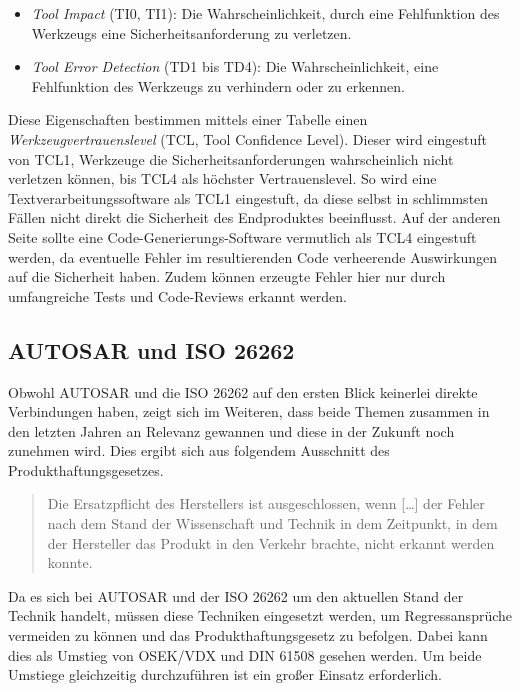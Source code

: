 \documentclass[
  a4paper,					    %
  twoside,
  DIV=calc,     				%
  bibliography=totoc,
  cleardoublepage=empty,
  ngerman,     					%
  final       					%
]{scrbook}
\begin{document}
\begin{itemize}
    \item \emph{Tool Impact} (TI0, TI1): Die Wahrscheinlichkeit, durch eine Fehlfunktion des Werkzeugs eine Sicherheitsanforderung zu verletzen.
    \item \emph{Tool Error Detection} (TD1 bis TD4): Die Wahrscheinlichkeit, eine Fehlfunktion des Werkzeugs zu verhindern oder zu erkennen.
\end{itemize}

Diese Eigenschaften bestimmen mittels einer Tabelle einen \emph{Werkzeugvertrauenslevel} (TCL, Tool Confidence Level). Dieser wird eingestuft von TCL1, Werkzeuge die Sicherheitsanforderungen wahrscheinlich nicht verletzen können, bis TCL4 als höchster Vertrauenslevel. So wird eine Textverarbeitungssoftware als TCL1 eingestuft, da diese selbst in schlimmsten Fällen nicht direkt die Sicherheit des Endproduktes beeinflusst. Auf der anderen Seite sollte eine Code-Generierungs-Software vermutlich als TCL4 eingestuft werden, da eventuelle Fehler im resultierenden Code verheerende Auswirkungen auf die Sicherheit haben. Zudem können erzeugte Fehler hier nur durch umfangreiche Tests und Code-Reviews erkannt werden.




\subsection{AUTOSAR und ISO 26262}
\label{sec:ISO26262_autosar}
Obwohl AUTOSAR und die ISO 26262 auf den ersten Blick keinerlei direkte Verbindungen haben, zeigt sich im Weiteren, dass beide Themen zusammen in den letzten Jahren an Relevanz gewannen und diese in der Zukunft noch zunehmen wird. Dies ergibt sich aus folgendem Ausschnitt des Produkthaftungsgesetzes.

\begin{quote}
Die Ersatzpflicht des Herstellers ist ausgeschlossen, wenn [\dots] der Fehler nach dem Stand der Wissenschaft und Technik in dem Zeitpunkt, in dem der Hersteller das Produkt in den Verkehr brachte, nicht erkannt werden konnte.\cite{ProdG}
\end{quote}

Da es sich bei AUTOSAR und der ISO 26262 um den aktuellen Stand der Technik handelt, müssen diese Techniken eingesetzt werden, um Regressansprüche vermeiden zu können und das Produkthaftungsgesetz zu befolgen. Dabei kann dies als Umstieg von OSEK/VDX und DIN 61508 gesehen werden. Um beide Umstiege gleichzeitig durchzuführen ist ein großer Einsatz erforderlich. 
\end{document}
